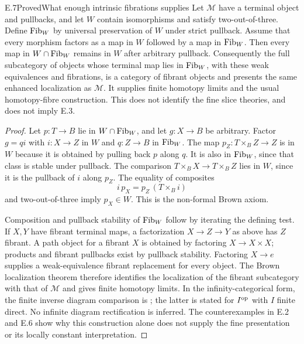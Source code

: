 \begin{claim}{E.7}{Proved}{What enough intrinsic fibrations supplies}
Let $\mathcal M$ have a terminal object and pullbacks, and let $W$ contain isomorphisms and satisfy two-out-of-three. Define $\mathrm{Fib}_W$ by universal preservation of $W$ under strict pullback. Assume that every morphism factors as a map in $W$ followed by a map in $\mathrm{Fib}_W$. Then every map in $W\cap\mathrm{Fib}_W$ remains in $W$ after arbitrary pullback. Consequently the full subcategory of objects whose terminal map lies in $\mathrm{Fib}_W$, with these weak equivalences and fibrations, is a category of fibrant objects and presents the same enhanced localization as $\mathcal M$. It supplies finite homotopy limits and the usual homotopy-fibre construction. This does not identify the fine slice theories, and does not imply E.3.
\end{claim}
\begin{proof}
Let $p:T\to B$ lie in $W\cap\mathrm{Fib}_W$, and let $g:X\to B$ be arbitrary. Factor $g=qi$ with $i:X\to Z$ in $W$ and $q:Z\to B$ in $\mathrm{Fib}_W$. The map $p_Z:T\times_BZ\to Z$ is in $W$ because it is obtained by pulling back $p$ along $q$. It is also in $\mathrm{Fib}_W$, since that class is stable under pullback. The comparison $T\times_BX\to T\times_BZ$ lies in $W$, since it is the pullback of $i$ along $p_Z$. The equality of composites
\[
 i\,p_X=p_Z\,(T\times_B i)
\]
and two-out-of-three imply $p_X\in W$. This is the non-formal Brown axiom.

Composition and pullback stability of $\mathrm{Fib}_W$ follow by iterating the defining test. If $X,Y$ have fibrant terminal maps, a factorization $X\to Z\to Y$ as above has $Z$ fibrant. A path object for a fibrant $X$ is obtained by factoring $X\to X\times X$; products and fibrant pullbacks exist by pullback stability. Factoring $X\to e$ supplies a weak-equivalence fibrant replacement for every object. The Brown localization theorem therefore identifies the localization of the fibrant subcategory with that of $\mathcal M$ and gives finite homotopy limits. In the infinity-categorical form, the finite inverse diagram comparison is \citet[Theorems 7.5.18 and 7.6.17]{BCCisinski2019}; the latter is stated for $I^{\mathrm{op}}$ with $I$ finite direct. No infinite diagram rectification is inferred. The counterexamples in E.2 and E.6 show why this construction alone does not supply the fine presentation or its locally constant interpretation.
\end{proof}

